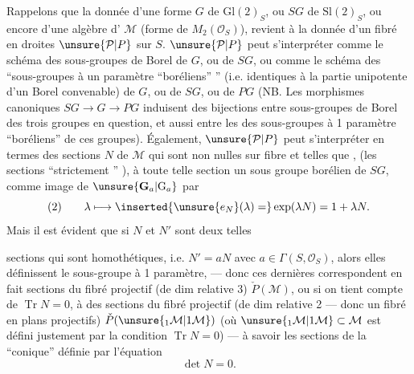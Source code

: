 Rappelons que la donnée  d'une forme $G$ de $\mathrm{Gl}(2)_S$, ou $SG$ de $\mathrm{Sl}(2)_S$,  ou encore d'une algèbre d' $\mathcal M$ (forme de $M_2(\mathcal O_S)$), revient à la donnée d'un fibré en droites  $\unsure{\mathcal P|P}$ sur $S$.
$\unsure{\mathcal P|P}$ peut s'interpréter comme le schéma des sous-groupes de Borel  de $G$, ou  de $SG$,  ou comme le schéma des ``sous-groupes  à un paramètre ``boréliens'' '' (i.e. identiques à la partie unipotente d'un Borel convenable)  de $G$, ou de $SG$, ou de $PG$ (NB. Les morphismes canoniques $SG\longrightarrow G\longrightarrow PG$ induisent des bijections entre  sous-groupes de Borel des trois groupes en question, et aussi entre les  des sous-groupes à 1 paramètre ``boréliens'' de ces groupes).
Également, $\unsure{\mathcal P|P}$ peut s'interpréter en termes des sections $N$  de $\mathcal M$ qui sont non nulles sur  fibre et telles que ,
\inserted{\[
(1)\qquad\det N=0,\quad\operatorname{Tr}N=0\qquad\text{d'où }N^2=0
\]}
(les sections ``strictement '' ), à toute telle section  un sous groupe  borélien de $SG$, comme image de $\unsure{\mathbf G_a|\mathrm G_a}$ par
\[
(2)\qquad\lambda\longmapsto\inserted{\unsure{e_N}(\lambda)=}\exp(\lambda N)=1+\lambda N.
\]
Mais il est évident que si $N$ et $N'$ sont deux telles



sections qui sont homothétiques, i.e. $N'=aN$ avec $a\in\Gamma(S,\mathcal O_S)$,  alors elles définissent le  sous-groupe à 1 paramètre, --- donc ces dernières correspondent en fait  sections du fibré projectif (de dim relative 3) $\check P(\mathcal M)$, ou si on tient compte de $\operatorname{Tr}N=0$,  à des sections du fibré projectif (de dim relative 2 --- donc un fibré en plans projectifs) $\check P(\unsure{{}_1\mathcal M|1\mathcal M})$ (où $\unsure{{}_1\mathcal M|1\mathcal M}\subset\mathcal M$ est défini justement par la condition $\operatorname{Tr}N=0$) --- à savoir les sections de la  ``conique'' définie par l'équation
\[
\det N=0.
\]

